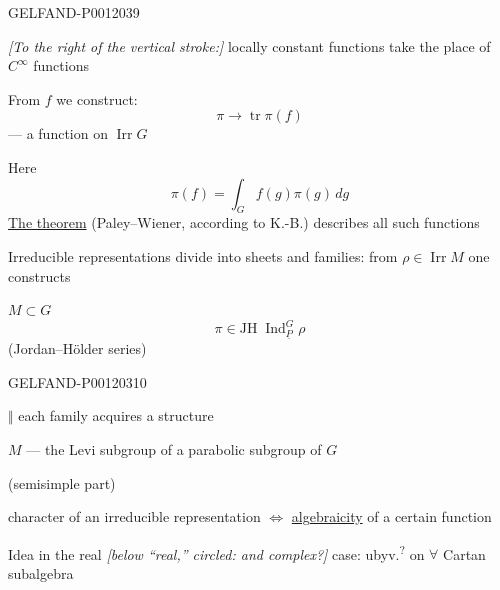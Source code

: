 \begin{GelfandAdjacentEvidence}{GELFAND-P001203}{9}


\textit{[To the right of the vertical stroke:]} locally constant functions take the place of \(C^\infty\) functions

From \(f\) we construct:
\[
\pi\longrightarrow\operatorname{tr}\pi(f)
\]
--- a function on \(\operatorname{Irr}G\)

Here
\[
\pi(f)=\int_G f(g)\pi(g)\,dg
\]
\underline{The theorem} (Paley--Wiener, according to K.-B.) describes all such functions

Irreducible representations divide into sheets and families: from \(\rho\in\operatorname{Irr}M\) one constructs

\(M\subset G\)
\[
\pi\in\mathrm{JH}\;\operatorname{Ind}_{\underline{P}}^{G}\rho
\]
(Jordan--Hölder series)
\end{GelfandAdjacentEvidence}
\begin{GelfandAdjacentEvidence}{GELFAND-P001203}{10}


\(\Vert\) each family acquires a structure

\(M\) --- the Levi subgroup of a parabolic subgroup of \(G\)

(semisimple part)

character of an irreducible representation \(\Leftrightarrow\) \underline{algebraicity} of a certain function

Idea in the real \textit{[below “real,” circled: and complex?]} case: ubyv.\textsuperscript{?} on \(\forall\) Cartan subalgebra
\end{GelfandAdjacentEvidence}



